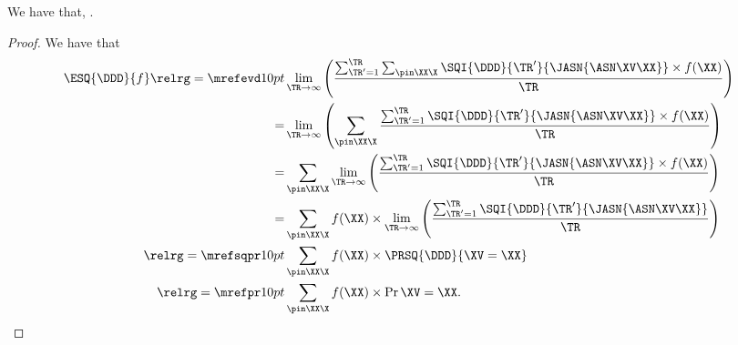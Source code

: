 \begin{proposition}
  We have that, \evexprprop.%
\end{proposition}

\begin{proof}
  We have that
  \begin{align*}
    \ESQ{\DDD}{f} \relrg = {\mrefevd} 10pt &
    \lim_{\TR \rightarrow \infty}\left(\frac{\sum_{\TR' = 1}^{\TR}\sum_{\pin\XX\X}\SQI{\DDD}{\TR'}{\JASN{\ASN\XV\XX}}\times f(\XX)}{\TR}\right)\\
          = & \lim_{\TR \rightarrow \infty}\left(\sum_{\pin\XX\X}\frac{\sum_{\TR' = 1}^{\TR}\SQI{\DDD}{\TR'}{\JASN{\ASN\XV\XX}}\times f(\XX)}{\TR}\right)\\
          = & \sum_{\pin\XX\X}\lim_{\TR \rightarrow \infty}\left(\frac{\sum_{\TR' = 1}^{\TR}\SQI{\DDD}{\TR'}{\JASN{\ASN\XV\XX}}\times f(\XX)}{\TR}\right)\\
          = & \sum_{\pin\XX\X}f(\XX) \times \lim_{\TR \rightarrow \infty}\left(\frac{\sum_{\TR' = 1}^{\TR}\SQI{\DDD}{\TR'}{\JASN{\ASN\XV\XX}}}{\TR}\right)\\
      \relrg = {\mrefsqpr} 10pt & \sum_{\pin\XX\X}f(\XX) \times \PRSQ{\DDD}{\XV = \XX}\\
      \relrg = {\mrefpr} 10pt & \sum_{\pin\XX\X}f(\XX) \times \Pr{\XV = \XX}.
  \end{align*}
\end{proof}
